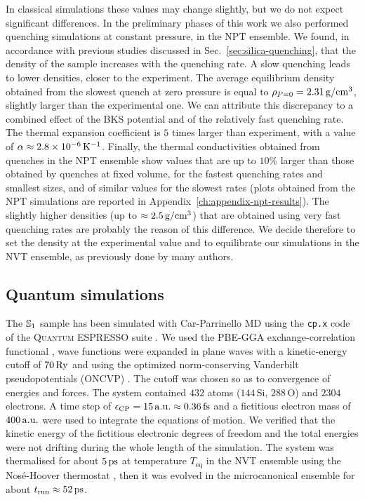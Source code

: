 In classical simulations these values may change slightly, but we do not expect significant differences. 
In the preliminary phases of this work we also performed quenching simulations at constant pressure, in the NPT ensemble. 
We found, in accordance with previous studies discussed in Sec.~\ref{sec:silica-quenching}, that the density of the sample increases with the quenching rate. A slow quenching leads to lower densities, closer to the experiment. The average equilibrium density obtained from the slowest quench at zero pressure is equal to $\rho_{P=0}=2.31\,\mathrm{g/cm^3}$, slightly larger than the experimental one. We can attribute this discrepancy to a combined effect of the BKS potential and of the relatively fast quenching rate. 
The thermal expansion coefficient is $5$ times larger than experiment, with a value of $\alpha\approx 2.8\times 10^{-6} \,\mathrm{K^{-1}}$. 
Finally, the thermal conductivities obtained from quenches in the NPT ensemble show values that are up to $10\%$ larger than those obtained by quenches at fixed volume, for the fastest quenching rates and smallest sizes, and of similar values for the slowest rates (plots obtained from the NPT simulations are reported in Appendix~\ref{ch:appendix-npt-results}). 
The slightly higher densities (up to $\approx 2.5\,\mathrm{g/cm^3}$) that are obtained using very fast quenching rates are probably the reason of this difference. 
We decide therefore to set the density at the experimental value and to equilibrate our simulations in the NVT ensemble, as previously done by many authors.




\subsection{Quantum simulations}  \label{sec:results-simulations-quantum}
The $\S1$ sample has been simulated with Car-Parrinello MD using the \texttt{cp.x} code of the \textsc{Quantum ESPRESSO} suite \cite{Giannozzi2009,Giannozzi2017}. 
We used the PBE-GGA exchange-correlation functional \cite{Perdew1996}, wave functions were expanded in plane waves with a kinetic-energy cutoff of $70\,\mathrm{Ry}$ and using the optimized norm-conserving Vanderbilt pseudopotentials (ONCVP) \cite{Schlipf2015,Hamann2013}. The cutoff was chosen so as to convergence of energies and forces. 
The system contained $432$ atoms ($144\,$Si, $288\,$O) and $2304$ electrons. A time step of $\epsilon_\textrm{CP} = 15\,\mathrm{a.u.} \approx 0.36\,\mathrm{fs}$ and a fictitious electron mass of $400\,\mathrm{a.u.}$ were used to integrate the equations of motion. 
We verified that the kinetic energy of the fictitious electronic degrees of freedom and the total energies were not drifting during the whole length of the simulation. 
The system was thermalised for about $5\,\mathrm{ps}$ at temperature $T_\mathrm{eq}$ in the NVT ensemble using the Nos\'e-Hoover thermostat \cite{Nose1984,Hoover1985}, then it was evolved in the microcanonical ensemble for about $t_\mathrm{run}\approx 52\,\mathrm{ps}$. 

